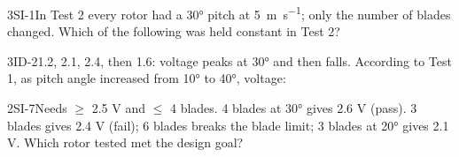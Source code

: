\documentclass[11pt]{article}
\begin{document}
\begin{minipage}[t]{0.32\linewidth}
\end{minipage}\hfill
\begin{minipage}[t]{0.32\linewidth}
\end{minipage}\hfill
\begin{minipage}[t]{0.32\linewidth}
\end{minipage}
\passageend

\begin{q}{3}{SI-1}{In Test 2 every rotor had a \ang{30} pitch at \SI{5}{\metre\per\second}; only the number of blades changed.}
Which of the following was held constant in Test 2?
\end{q}

\begin{q}{3}{ID-2}{1.2, 2.1, 2.4, then 1.6: voltage peaks at \ang{30} and then falls.}
According to Test 1, as pitch angle increased from \ang{10} to \ang{40}, voltage:
\end{q}

\begin{q}{2}{SI-7}{Needs $\geq$ 2.5 V and $\leq$ 4 blades. 4 blades at \ang{30} gives 2.6 V (pass). 3 blades gives 2.4 V (fail); 6 blades breaks the blade limit; 3 blades at \ang{20} gives 2.1 V.}
Which rotor tested met the design goal?
\end{q}
\end{document}
